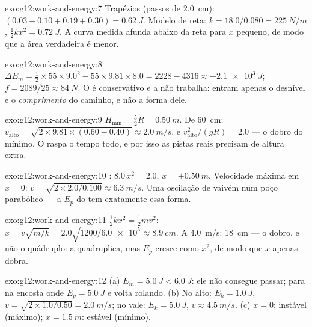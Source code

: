 \begin{solution}{exo:g12:work-and-energy:7}
Trapézios (passos de \qty{2.0}{cm}): $(0.03 + 0.10 + 0.19 + 0.30) =
\qty{0.62}{J}$. Modelo de reta: $k = 18.0/0.080 = \qty{225}{N/m}$,
$\tfrac12 kx^2 = \qty{0.72}{J}$. A curva medida afunda abaixo da reta
para $x$ pequeno, de modo que a área verdadeira é menor.
\end{solution}

\begin{solution}{exo:g12:work-and-energy:8}
$\Delta E_m = \tfrac12 \times 55 \times 9.0^2 - 55 \times 9.81 \times
8.0 = 2228 - 4316 \approx \qty{-2.1e3}{J}$;
$f = 2089/25 \approx \qty{84}{N}$. O  é conservativo e a 
não trabalha: entram apenas o desnível e o \emph{comprimento} do
caminho, e não a forma dele.
\end{solution}

\begin{solution}{exo:g12:work-and-energy:9}
$H_{\min} = \tfrac52 R = \qty{0.50}{m}$. De \qty{60}{cm}:
$v_{\text{alto}} = \sqrt{2 \times 9.81 \times (0.60 - 0.40)} \approx
\qty{2.0}{m/s}$, e $v_{\text{alto}}^2/(gR) = 2.0$ --- o dobro do mínimo.
O  raspa  o tempo todo, e por isso as pistas reais precisam
de altura extra.
\end{solution}

\begin{solution}{exo:g12:work-and-energy:10}
: $8.0\,x^2 = 2.0$, $x = \pm\qty{0.50}{m}$. Velocidade
máxima em $x = 0$: $v = \sqrt{2 \times 2.0/0.100} \approx \qty{6.3}{m/s}$.
Uma oscilação de vaivém num poço parabólico --- a $E_p$ do  tem exatamente essa forma.
\end{solution}

\begin{solution}{exo:g12:work-and-energy:11}
$\tfrac12 kx^2 = \tfrac12 mv^2$:
$x = v\sqrt{m/k} = 2.0\sqrt{1200/\num{6.0e5}} \approx \qty{8.9}{cm}$. A
\qty{4.0}{m/s}: \qty{18}{cm} --- o dobro, e não o quádruplo: a 
quadruplica, mas $E_p$ cresce como $x^2$, de modo que $x$ apenas dobra.
\end{solution}

\begin{solution}{exo:g12:work-and-energy:12}
(a) $E_m = \qty{5.0}{J} < \qty{6.0}{J}$: ele não consegue passar; para na
encosta onde $E_p = \qty{5.0}{J}$ e volta rolando. (b) No alto:
$E_k = \qty{1.0}{J}$, $v = \sqrt{2 \times 1.0/0.50} = \qty{2.0}{m/s}$; no
vale: $E_k = \qty{5.0}{J}$, $v \approx \qty{4.5}{m/s}$. (c) $x = 0$:
instável (máximo); $x = \qty{1.5}{m}$: estável (mínimo).
\end{solution}

